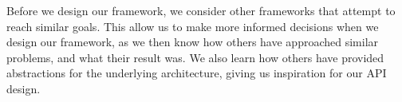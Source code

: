\label{cha:relatedWorks}
Before we design our framework, we consider other frameworks that attempt to reach similar goals. This allow us to make more informed decisions when we design our framework, as we then know how others have approached similar problems, and what their result was. We also learn how others have provided abstractions for the underlying architecture, giving us inspiration for our API design.

